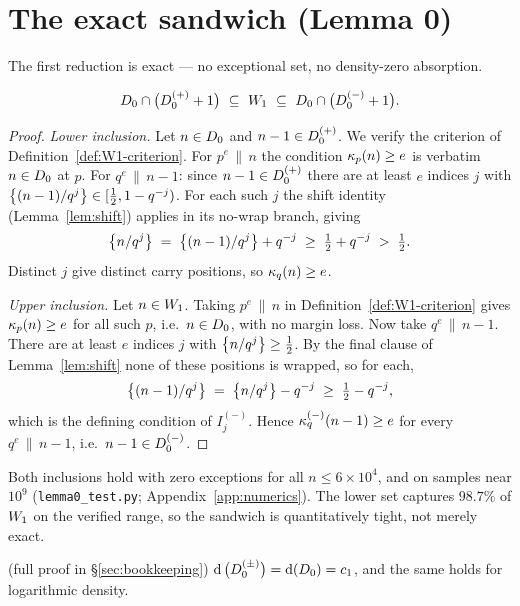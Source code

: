 \section{The exact sandwich (Lemma 0)}\label{sec:sandwich}

The first reduction is exact --- no exceptional set, no density-zero
absorption.

\begin{lemma}\label{lem:sandwich}
\statusPM\quad
\[
\D\cap\big(\Dp+1\big)\ \subseteq\ \W\ \subseteq\ \D\cap\big(\Dm+1\big).
\]
\end{lemma}

\begin{proof}
\emph{Lower inclusion.} Let $n\in D_0$ and $n-1\in D_0^{(+)}$. We verify the
criterion of Definition~\ref{def:W1-criterion}. For $p^e\,\|\,n$ the
condition $\kappa_p(n)\ge e$ is verbatim $n\in D_0$ at $p$. For
$q^e\,\|\,n-1$: since $n-1\in D_0^{(+)}$ there are at least $e$ indices $j$ with
$\left\{(n-1)/q^j\right\}\in[\tfrac12,1-q^{-j})$. For each such $j$ the shift
identity (Lemma~\ref{lem:shift}) applies in its no-wrap branch, giving
\[
\left\{n/q^j\right\}\;=\;\left\{(n-1)/q^j\right\}+q^{-j}\;\ge\;\tfrac12+q^{-j}\;>\;\tfrac12 .
\]
Distinct $j$ give distinct carry positions, so $\kappa_q(n)\ge e$.

\emph{Upper inclusion.} Let $n\in W_1$. Taking $p^e\,\|\,n$ in
Definition~\ref{def:W1-criterion} gives $\kappa_p(n)\ge e$ for all such $p$,
i.e.\ $n\in D_0$, with no margin loss. Now take $q^e\,\|\,n-1$. There are at
least $e$ indices $j$ with $\left\{n/q^j\right\}\ge\tfrac12$. By the final clause of
Lemma~\ref{lem:shift} none of these positions is wrapped, so for each,
\[
\left\{(n-1)/q^j\right\}\;=\;\left\{n/q^j\right\}-q^{-j}\;\ge\;\tfrac12-q^{-j},
\]
which is the defining condition of $I^{(-)}_j$. Hence
$\kappa_q^{(-)}(n-1)\ge e$ for every $q^e\,\|\,n-1$, i.e.\ $n-1\in D_0^{(-)}$.
\end{proof}

\begin{remark}
Both inclusions hold with zero exceptions for all $n\le 6\times10^4$, and
on samples near $10^9$ (\texttt{lemma0\_test.py}; Appendix~\ref{app:numerics}).
The lower set captures $98.7\%$ of $W_1$ on the verified range, so the
sandwich is quantitatively tight, not merely exact.
\end{remark}

\begin{lemma}\label{lem:margins}
\statusP{} (full proof in \S\ref{sec:bookkeeping})\quad
$\operatorname{d}\big(D_0^{(\pm)}\big)=\operatorname{d}(D_0)=c_1$, and the same holds for
logarithmic density.
\end{lemma}

